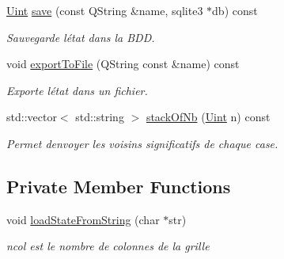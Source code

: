 \begin{DoxyCompactItemize}
\mbox{\hyperlink{state_8h_a4840c4503b7d10cea5e08416eb3716f1}{Uint}} \mbox{\hyperlink{class_state_adcb67718b6f2502d7e4e150a18a5bf0b}{save}} (const Q\+String \&name, sqlite3 $\ast$db) const
\begin{DoxyCompactList}\small\item\em Sauvegarde l\textquotesingle{}état dans la B\+DD. \end{DoxyCompactList}\item 
void \mbox{\hyperlink{class_state_a7dfee0c004e500cca7f050e800daefcf}{export\+To\+File}} (Q\+String const \&name) const
\begin{DoxyCompactList}\small\item\em Exporte l\textquotesingle{}état dans un fichier. \end{DoxyCompactList}\item 
std\+::vector$<$ std\+::string $>$ \mbox{\hyperlink{class_state_a9681c4601cfbcd05f9c203770105bd1e}{stack\+Of\+Nb}} (\mbox{\hyperlink{state_8h_a4840c4503b7d10cea5e08416eb3716f1}{Uint}} n) const
\begin{DoxyCompactList}\small\item\em Permet d\textquotesingle{}envoyer les voisins significatifs de chaque case. \end{DoxyCompactList}\end{DoxyCompactItemize}
\subsection*{Private Member Functions}
\begin{DoxyCompactItemize}
\item 
void \mbox{\hyperlink{class_state_a34eca90486ef2fa8516d255279ce394f}{load\+State\+From\+String}} (char $\ast$str)
\begin{DoxyCompactList}\small\item\em ncol est le nombre de colonnes de la grille \end{DoxyCompactList}\end{DoxyCompactItemize}
